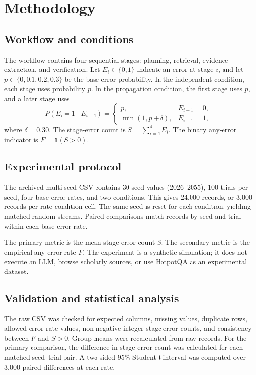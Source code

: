 \documentclass[sigconf,nonacm]{acmart}
\begin{document}
\section{Methodology}
\subsection{Workflow and conditions}
The workflow contains four sequential stages: planning, retrieval, evidence extraction, and verification. Let $E_i\in\{0,1\}$ indicate an error at stage $i$, and let $p\in\{0,0.1,0.2,0.3\}$ be the base error probability. In the independent condition, each stage uses probability $p$. In the propagation condition, the first stage uses $p$, and a later stage uses
\[
P(E_i=1\mid E_{i-1})=
\begin{cases}
p,&E_{i-1}=0,\\
\min(1,p+\delta),&E_{i-1}=1,
\end{cases}
\]
where $\delta=0.30$. The stage-error count is $S=\sum_{i=1}^{4}E_i$. The binary any-error indicator is $F=\mathbb{1}(S>0)$.

\subsection{Experimental protocol}
The archived multi-seed CSV contains 30 seed values (2026--2055), 100 trials per seed, four base error rates, and two conditions. This gives 24,000 records, or 3,000 records per rate-condition cell. The same seed is reset for each condition, yielding matched random streams. Paired comparisons match records by seed and trial within each base error rate.

The primary metric is the mean stage-error count $S$. The secondary metric is the empirical any-error rate $F$. The experiment is a synthetic simulation; it does not execute an LLM, browse scholarly sources, or use HotpotQA as an experimental dataset.

\subsection{Validation and statistical analysis}
The raw CSV was checked for expected columns, missing values, duplicate rows, allowed error-rate values, non-negative integer stage-error counts, and consistency between $F$ and $S>0$. Group means were recalculated from raw records. For the primary comparison, the difference in stage-error count was calculated for each matched seed--trial pair. A two-sided 95\% Student t interval was computed over 3,000 paired differences at each rate.
\end{document}
